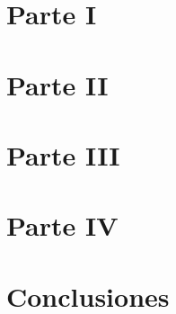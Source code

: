 







\tableofcontents
\newpage



\section{Parte I}


\section{Parte II}
\label{sec:parteii}


\section{Parte III}


\section{Parte IV}


\section{Conclusiones}




